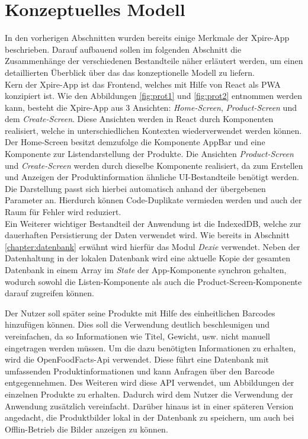\newpage
\section{Konzeptuelles Modell}

In den vorherigen Abschnitten wurden bereits einige Merkmale der Xpire-App beschrieben. Darauf aufbauend sollen im folgenden Abschnitt die Zusammenhänge der verschiedenen Bestandteile näher erläutert werden, um einen detaillierten Überblick über das das konzeptionelle Modell zu liefern.\\
Kern der Xpire-App ist das Frontend, welches mit Hilfe von React als PWA konzipiert ist. Wie den Abbildungen \ref{fig:prot1} und \ref{fig:prot2} entnommen werden kann, besteht die Xpire-App aus 3 Ansichten: \textit{Home-Screen}, \textit{Product-Screen} und dem \textit{Create-Screen}. Diese Ansichten werden in React durch Komponenten realisiert, welche in unterschiedlichen Kontexten wiederverwendet werden können. Der Home-Screen besitzt demzufolge die Komponente AppBar und eine Komponente zur Listendarstellung der Produkte. Die Ansichten \textit{Product-Screen} und \textit{Create-Screen} werden durch dieselbe Komponente realisiert, da zum Erstellen und Anzeigen der Produktinformation ähnliche UI-Bestandteile benötigt werden. Die Darstellung passt sich hierbei automatisch anhand der übergebenen Parameter an. Hierdurch können Code-Duplikate vermieden werden und auch der Raum für Fehler wird reduziert.\\
Ein Weiterer wichtiger Bestandteil der Anwendung ist die IndexedDB, welche zur dauerhaften Persistierung der Daten verwendet wird. Wie bereits in Abschnitt \ref{chapter:datenbank} erwähnt wird hierfür das Modul \textit{Dexie} verwendet. Neben der Datenhaltung in der lokalen Datenbank wird eine aktuelle Kopie der gesamten Datenbank in einem Array im \textit{State} der App-Komponente synchron gehalten, wodurch sowohl die Listen-Komponente als auch die Product-Screen-Komponente darauf zugreifen können.

Der Nutzer soll später seine Produkte mit Hilfe des einheitlichen Barcodes hinzufügen können. Dies soll die Verwendung deutlich beschleunigen und vereinfachen, da so Informationen wie Titel, Gewicht, usw. nicht manuell eingetragen werden müssen. Um die dazu benötigten Informationen zu erhalten, wird die OpenFoodFacts-Api verwendet. Diese führt eine Datenbank mit umfassenden Produktinformationen und kann Anfragen über den Barcode entgegennehmen. Des Weiteren wird diese API verwendet, um Abbildungen der einzelnen Produkte zu erhalten. Dadurch wird dem Nutzer die Verwendung der Anwendung zusätzlich vereinfacht. Darüber hinaus ist in einer späteren Version angedacht, die Produktbilder lokal in der Datenbank zu speichern, um auch bei Offlin-Betrieb die Bilder anzeigen zu können.